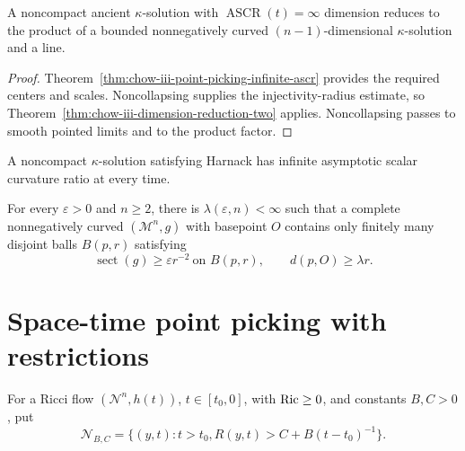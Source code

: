 \begin{corollary}
\label{cor:chow-iii-dimension-reduction-kappa-solutions}
A noncompact ancient \(\kappa\)-solution with
\(\operatorname{ASCR}(t)=\infty\) dimension reduces to the product of a
bounded nonnegatively curved \((n-1)\)-dimensional \(\kappa\)-solution and a
line.
\end{corollary}
\begin{proof}
Theorem~\ref{thm:chow-iii-point-picking-infinite-ascr} provides the required
centers and scales.  Noncollapsing supplies the injectivity-radius estimate,
so Theorem~\ref{thm:chow-iii-dimension-reduction-two} applies.  Noncollapsing
passes to smooth pointed limits and to the product factor.
\end{proof}

\begin{remark}
\label{rem:chow-iii-kappa-solution-harnack-ascr}
A noncompact \(\kappa\)-solution satisfying Harnack has infinite asymptotic
scalar curvature ratio at every time.
\end{remark}

\begin{theorem}
\label{thm:chow-iii-finite-remote-curvature-bumps}
For every \(\varepsilon>0\) and \(n\ge2\), there is
\(\lambda(\varepsilon,n)<\infty\) such that a complete nonnegatively curved
\((\mathcal M^n,g)\) with basepoint \(O\) contains only finitely many disjoint
balls \(B(p,r)\) satisfying
\[
 \operatorname{sect}(g)\ge\varepsilon r^{-2}\ \text{on }B(p,r),
 \qquad d(p,O)\ge\lambda r.
\]
\end{theorem}

\section{Space-time point picking with restrictions}

For a Ricci flow \((\mathcal N^n,h(t))\), \(t\in[t_0,0]\), with
\(\operatorname{Ric}\ge0\), and constants \(B,C>0\), put
\[
 \mathcal N_{B,C}=\{(y,t):t>t_0, R(y,t)>C+B(t-t_0)^{-1}\}.
\]

